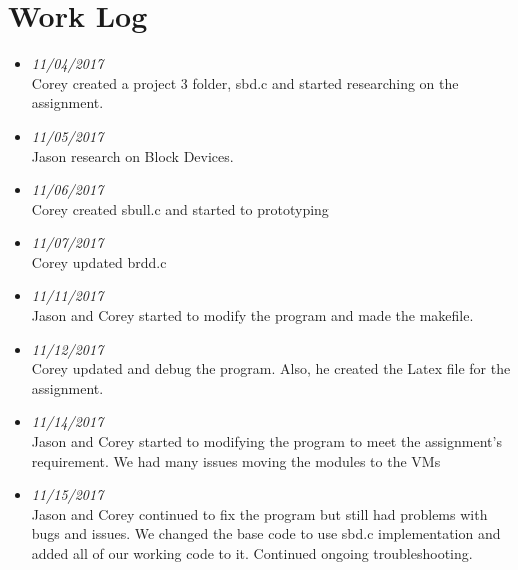 \documentclass[onecolumn, draftclsnofoot,10pt, compsoc]{IEEEtran}
\begin{document}
\section{Work Log}
\begin{itemize}

\item \textit{11/04/2017}\\ Corey created a project 3 folder, sbd.c and started researching on the assignment. \\
\item \textit{11/05/2017}\\ Jason research on Block Devices. \\
\item \textit{11/06/2017}\\ Corey created sbull.c and started to prototyping \\ 
\item \textit{11/07/2017}\\ Corey updated brdd.c \\
\item \textit{11/11/2017}\\ Jason and Corey started to modify the program and made the makefile. \\
\item \textit{11/12/2017}\\ Corey updated and debug the program. Also, he created the Latex file for the assignment. \\ 
\item \textit{11/14/2017}\\ Jason and Corey started to modifying the program to meet the assignment's requirement. We had many issues moving the modules to the VMs \\
\item \textit{11/15/2017}\\ Jason and Corey continued to fix the program but still had problems with bugs and issues. We changed the base code to use sbd.c implementation and added all of our working code to it. Continued ongoing troubleshooting. \\
\end{itemize} 
\end{document}
